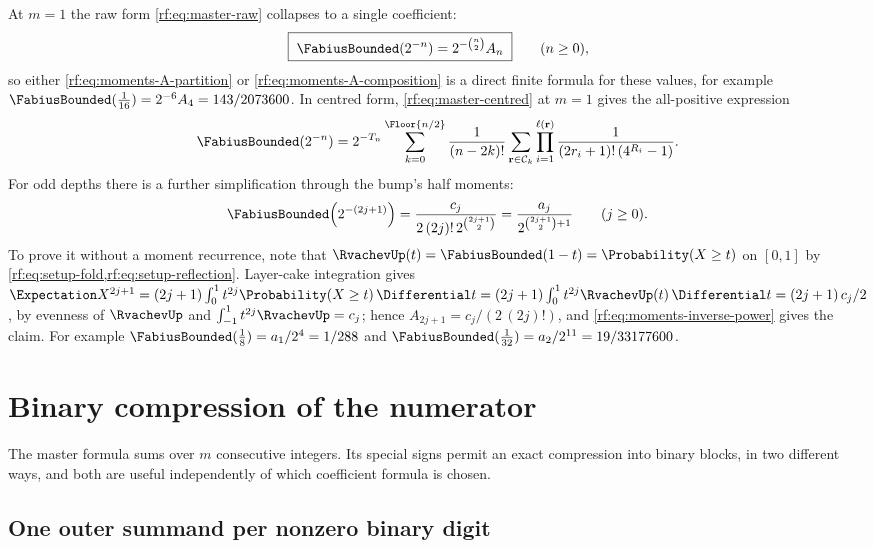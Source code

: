 \documentclass[11pt,oneside]{article}
\theoremstyle{plain}
\theoremstyle{definition}
\theoremstyle{remark}
\newcommand{\Fb}{\FabiusBounded}            %
\newcommand{\up}{\RvachevUp}                %
\newcommand{\E}{\Expectation}
\newcommand{\Prob}{\Probability}
\newcommand{\dd}{\Differential}
\newcommand{\Comp}[1]{\mathcal{C}_{#1}}     %
\newcommand{\Tr}[1]{T_{#1}}                 %
\begin{document}
At $m=1$ the raw form \cref{rf:eq:master-raw} collapses to a single
coefficient:
\begin{equation}
 \boxed{\;\Fb(2^{-n})=2^{-\binom{n}{2}}A_{n}\;}
 \qquad(n\ge0),
 \label{rf:eq:moments-inverse-power}
\end{equation}
so either \cref{rf:eq:moments-A-partition} or
\cref{rf:eq:moments-A-composition} is a direct finite formula for these
values, for example $\Fb(\tfrac1{16})=2^{-6}A_{4}=143/2073600$.  In centred
form, \cref{rf:eq:master-centred} at $m=1$ gives the all-positive expression
\begin{equation}
 \Fb(2^{-n})=2^{-\Tr{n}}\sum_{k=0}^{\Floor{n/2}}\frac{1}{(n-2k)!}
 \sum_{\mathbf r\in\Comp{k}}\prod_{i=1}^{\ell(\mathbf r)}
 \frac{1}{(2r_{i}+1)!\,(4^{R_{i}}-1)}.
 \label{rf:eq:moments-inverse-power-positive}
\end{equation}
For odd depths there is a further simplification through the bump's half
moments:
\begin{equation}
 \Fb\!\left(2^{-(2j+1)}\right)=\frac{c_{j}}{2\,(2j)!\,2^{\binom{2j+1}{2}}}
 =\frac{a_{j}}{2^{\binom{2j+1}{2}+1}}\qquad(j\ge0).
 \label{rf:eq:moments-odd-depth}
\end{equation}
To prove it without a moment recurrence, note that
$\up(t)=\Fb(1-t)=\Prob(X\ge t)$ on $[0,1]$ by
\cref{rf:eq:setup-fold,rf:eq:setup-reflection}.  Layer-cake integration
gives $\E X^{2j+1}=(2j+1)\int_{0}^{1}t^{2j}\Prob(X\ge t)\,\dd t
=(2j+1)\int_{0}^{1}t^{2j}\up(t)\,\dd t=(2j+1)\,c_{j}/2$, by evenness of
$\up$ and $\int_{-1}^{1}t^{2j}\up=c_{j}$; hence
$A_{2j+1}=c_{j}/(2\,(2j)!)$, and \cref{rf:eq:moments-inverse-power} gives
the claim.  For example $\Fb(\tfrac18)=a_{1}/2^{4}=1/288$ and
$\Fb(\tfrac1{32})=a_{2}/2^{11}=19/33177600$.

\section{Binary compression of the numerator}
\label{rf:sec:binary}

The master formula sums over $m$ consecutive integers.  Its special signs
permit an exact compression into binary blocks, in two different ways, and
both are useful independently of which coefficient formula is chosen.

\subsection{One outer summand per nonzero binary digit}
\label{rf:sec:binary-block}
\end{document}
